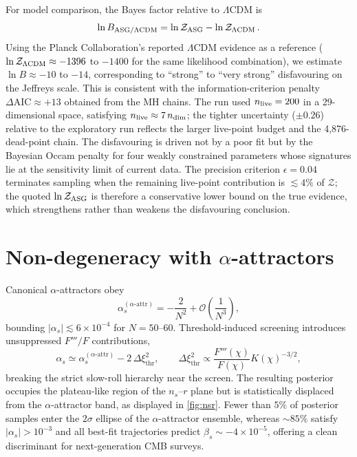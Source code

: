\documentclass[11pt,a4paper]{article}
\begin{document}
For model comparison, the Bayes factor relative to $\Lambda$CDM is
\begin{equation}
\ln B_{\rm ASG/\Lambda CDM}=\ln\mathcal{Z}_{\rm ASG}-\ln\mathcal{Z}_{\Lambda\rm CDM}\,.
\end{equation}
Using the Planck Collaboration's reported $\Lambda$CDM evidence as a reference ($\ln\mathcal{Z}_{\Lambda\rm CDM}\approx-1396$ to $-1400$ for the same likelihood combination), we estimate $\ln B\approx-10$ to $-14$, corresponding to ``strong'' to ``very strong'' disfavouring on the Jeffreys scale. This is consistent with the information-criterion penalty $\Delta\text{AIC}\approx+13$ obtained from the MH chains. The run used $n_{\rm live}=200$ in a 29-dimensional space, satisfying $n_{\rm live}\approx7\,n_{\rm dim}$; the tighter uncertainty ($\pm0.26$) relative to the exploratory run reflects the larger live-point budget and the 4,876-dead-point chain. The disfavouring is driven not by a poor fit but by the Bayesian Occam penalty for four weakly constrained parameters whose signatures lie at the sensitivity limit of current data. The precision criterion $\epsilon=0.04$ terminates sampling when the remaining live-point contribution is $\lesssim4\%$ of $\mathcal{Z}$; the quoted $\ln\mathcal{Z}_{\rm ASG}$ is therefore a conservative lower bound on the true evidence, which strengthens rather than weakens the disfavouring conclusion.

\section{Non-degeneracy with $\alpha$-attractors}
\label{sec:nondegeneracy}
Canonical $\alpha$-attractors obey
\begin{equation}
\alpha_{s}^{(\alpha\text{-attr})}=-\frac{2}{N^{2}}+\mathcal{O}\left(\frac{1}{N^{3}}\right),
\end{equation}
bounding $|\alpha_{s}|\lesssim6\times10^{-4}$ for $N=50$--60. Threshold-induced screening introduces unsuppressed $F'''/F$ contributions,
\begin{equation}
\alpha_{s}\simeq \alpha_{s}^{(\alpha\text{-attr})}-2\,\Delta\xi_{\text{thr}}^{2}, \qquad \Delta\xi_{\text{thr}}^{2}\propto\frac{F'''(\chi)}{F(\chi)}K(\chi)^{-3/2},
\end{equation}
breaking the strict slow-roll hierarchy near the screen. The resulting posterior occupies the plateau-like region of the $n_{s}$--$r$ plane but is statistically displaced from the $\alpha$-attractor band, as displayed in \cref{fig:nsr}. Fewer than $5\%$ of posterior samples enter the $2\sigma$ ellipse of the $\alpha$-attractor ensemble, whereas ${\sim}85\%$ satisfy $|\alpha_{s}|>10^{-3}$ and all best-fit trajectories predict $\beta_{s}\sim -4\times10^{-5}$, offering a clean discriminant for next-generation CMB surveys.
\end{document}
